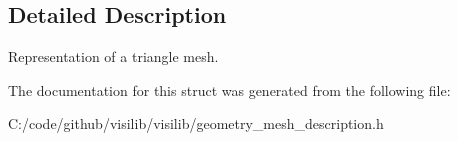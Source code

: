 \subsection{Detailed Description}
Representation of a triangle mesh. 

The documentation for this struct was generated from the following file\+:\begin{DoxyCompactItemize}
\item 
C\+:/code/github/visilib/visilib/geometry\+\_\+mesh\+\_\+description.\+h\end{DoxyCompactItemize}
